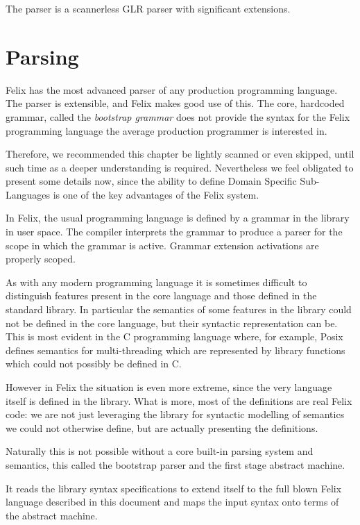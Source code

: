 \documentclass[oneside]{book}
\begin{document}
The parser is a scannerless GLR parser with significant
extensions.

\chapter{Parsing}
Felix has the most advanced parser of any production
programming language. The parser is extensible, and Felix
makes good use of this. The core, hardcoded grammar, called
the {\em bootstrap grammar} does not provide the syntax for
the Felix programming language the average production programmer
is interested in.

Therefore, we recommended this chapter be lightly scanned
or even skipped, until such time as a deeper understanding
is required. Nevertheless we feel obligated to present
some details now, since the ability to define Domain Specific
Sub-Languages is one of the key advantages of the Felix system.

In Felix, the usual programming language is defined by a grammar
in the library in user space. The compiler interprets the 
grammar to produce a parser
for the scope in which the grammar is active. Grammar extension
activations are properly scoped.

As with any modern programming language it is sometimes difficult
to distinguish features present in the core language and those
defined in the standard library. In particular the semantics of some 
features in the library could not be defined in the core language, 
but their syntactic representation can be. This is most evident
in the C programming language where, for example, Posix defines
semantics for multi-threading which are represented by library
functions which could not possibly be defined in C.

However in Felix the situation is even more extreme, since the very
language itself is defined in the library. What is more, most
of the definitions are real Felix code: we are not just
leveraging the library for syntactic modelling of semantics
we could not otherwise define, but are actually presenting
the definitions.

Naturally this is not possible without a core built-in parsing
system and semantics, this called the bootstrap parser
and the first stage abstract machine.

It reads the library syntax specifications to extend itself
to the full blown Felix language described in this document
and maps the input syntax onto terms of the abstract machine.
\end{document}
